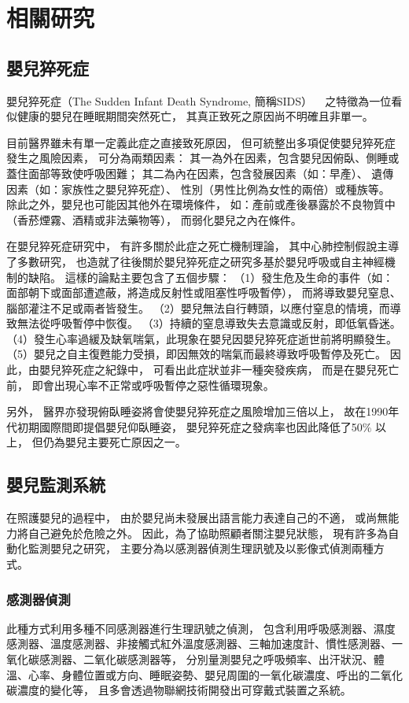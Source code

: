 \documentclass[class=NCU_thesis, crop=false]{standalone}
\begin{document}
\chapter{相關研究}

\section{嬰兒猝死症}
嬰兒猝死症（The Sudden Infant Death Syndrome, 簡稱SIDS）
~\cite{kinney_sudden_2009}
之特徵為一位看似健康的嬰兒在睡眠期間突然死亡，
其真正致死之原因尚不明確且非單一。

目前醫界雖未有單一定義此症之直接致死原因，
但可統整出多項促使嬰兒猝死症發生之風險因素，
可分為兩類因素：
其一為外在因素，包含嬰兒因俯臥、側睡或蓋住面部等致使呼吸困難；
其二為內在因素，包含發展因素（如：早產）、
遺傳因素（如：家族性之嬰兒猝死症）、
性別（男性比例為女性的兩倍）或種族等。
除此之外，嬰兒也可能因其他外在環境條件，
如：產前或產後暴露於不良物質中（香菸煙霧、酒精或非法藥物等），
而弱化嬰兒之內在條件。

在嬰兒猝死症研究中，
有許多關於此症之死亡機制理論，
其中心肺控制假說主導了多數研究，
也造就了往後關於嬰兒猝死症之研究多基於嬰兒呼吸或自主神經機制的缺陷。
這樣的論點主要包含了五個步驟：
（1）發生危及生命的事件（如：面部朝下或面部遭遮蔽，將造成反射性或阻塞性呼吸暫停），
而將導致嬰兒窒息、腦部灌注不足或兩者皆發生。
（2）嬰兒無法自行轉頭，以應付窒息的情境，而導致無法從呼吸暫停中恢復。
（3）持續的窒息導致失去意識或反射，即低氧昏迷。
（4）發生心率過緩及缺氧喘氣，此現象在嬰兒因嬰兒猝死症逝世前將明顯發生。
（5）嬰兒之自主復甦能力受損，即因無效的喘氣而最終導致呼吸暫停及死亡。
因此，由嬰兒猝死症之紀錄中，
可看出此症狀並非一種突發疾病，
而是在嬰兒死亡前，
即會出現心率不正常或呼吸暫停之惡性循環現象。

另外，
醫界亦發現俯臥睡姿將會使嬰兒猝死症之風險增加三倍以上，
故在1990年代初期國際間即提倡嬰兒仰臥睡姿，
嬰兒猝死症之發病率也因此降低了50\% 以上，
但仍為嬰兒主要死亡原因之一。

\section{嬰兒監測系統}
在照護嬰兒的過程中，
由於嬰兒尚未發展出語言能力表達自己的不適，
或尚無能力將自己避免於危險之外。
因此，為了協助照顧者關注嬰兒狀態，
現有許多為自動化監測嬰兒之研究，
主要分為以感測器偵測生理訊號及以影像式偵測兩種方式。

\subsection{感測器偵測}
此種方式利用多種不同感測器進行生理訊號之偵測，
包含利用呼吸感測器、濕度感測器、溫度感測器、非接觸式紅外溫度感測器、三軸加速度計、慣性感測器、一氧化碳感測器、二氧化碳感測器等，
分別量測嬰兒之呼吸頻率、出汗狀況、體溫、心率、身體位置或方向、睡眠姿勢、嬰兒周圍的一氧化碳濃度、呼出的二氧化碳濃度的變化等，
且多會透過物聯網技術開發出可穿戴式裝置之系統。
\end{document}
